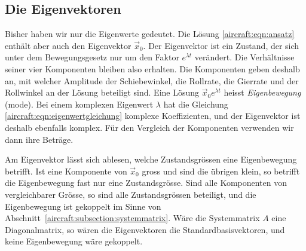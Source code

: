 \subsection{Die Eigenvektoren
\label{aircraft:section:5-eigenvektoren}}
Bisher haben wir nur die Eigenwerte gedeutet.
Die Lösung \eqref{aircraft:eqn:ansatz} enthält aber auch den
Eigenvektor $\vec x_0$.
Der Eigenvektor ist ein Zustand, der sich unter dem Bewegungsgesetz nur um
den Faktor $e^{\lambda t}$ verändert.
Die Verhältnisse seiner vier Komponenten bleiben also erhalten.
Die Komponenten geben deshalb an, mit welcher Amplitude der Schiebewinkel, die
Rollrate, die Gierrate und der Rollwinkel an der Lösung beteiligt sind.
Eine Lösung $\vec x_0 e^{\lambda t}$ heisst \emph{Eigenbewegung} (mode).
%
Bei einem komplexen Eigenwert $\lambda$ hat die Gleichung
\eqref{aircraft:eqn:eigenwertgleichung} komplexe Koeffizienten, und der
Eigenvektor ist deshalb ebenfalls komplex.
Für den Vergleich der Komponenten verwenden wir dann ihre Beträge.

Am Eigenvektor lässt sich ablesen, welche Zustandsgrössen eine Eigenbewegung
betrifft.
Ist eine Komponente von $\vec x_0$ gross und sind die übrigen klein, so
betrifft die Eigenbewegung fast nur eine Zustandsgrösse.
Sind alle Komponenten von vergleichbarer Grösse, so sind alle Zustandsgrössen
beteiligt, und die Eigenbewegung ist gekoppelt im Sinne von
Abschnitt~\ref{aircraft:subsection:systemmatrix}.
Wäre die Systemmatrix $A$ eine Diagonalmatrix, so wären die Eigenvektoren die
Standardbasisvektoren, und keine Eigenbewegung wäre gekoppelt.
